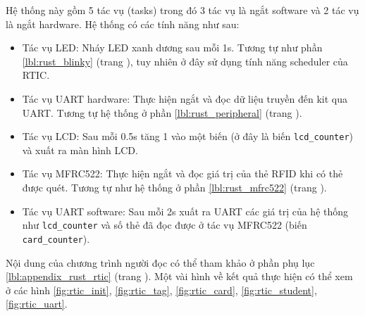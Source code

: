 Hệ thống này gồm 5 tác vụ (tasks) trong đó 3 tác vụ là ngắt software và 2 tác vụ là ngắt hardware.
Hệ thống có các tính năng như sau:
\begin{itemize}
    \item Tác vụ LED: Nháy LED xanh dương sau mỗi 1s. Tương tự như phần \ref{lbl:rust_blinky} (trang \pageref{lbl:rust_blinky}), tuy nhiên ở đây sử dụng tính năng scheduler của RTIC.
    \item Tác vụ UART hardware: Thực hiện ngắt và đọc dữ liệu truyền đến kit qua UART. Tương tự hệ thống ở phần \ref{lbl:rust_peripheral} (trang \pageref{lbl:rust_peripheral}).
    \item Tác vụ LCD: Sau mỗi 0.5s tăng 1 vào một biến (ở đây là biến \texttt{lcd_counter}) và xuất ra màn hình LCD.
    \item Tác vụ MFRC522: Thực hiện ngắt và đọc giá trị của thẻ RFID khi có thẻ được quét. Tương tự như hệ thống ở phần \ref{lbl:rust_mfrc522} (trang \pageref{lbl:rust_mfrc522}).
    \item Tác vụ UART software: Sau mỗi 2s xuất ra UART các giá trị của hệ thống như \texttt{lcd_counter} và số thẻ đã đọc được ở tác vụ MFRC522 (biến \texttt{card_counter}).
\end{itemize}

Nội dung của chương trình người đọc có thể tham khảo ở phần phụ lục \ref{lbl:appendix_rust_rtic} (trang \pageref{lbl:appendix_rust_rtic}).
Một vài hình về kết quả thực hiện có thể xem ở các hình \ref{fig:rtic_init}, \ref{fig:rtic_tag}, \ref{fig:rtic_card}, \ref{fig:rtic_student}, \ref{fig:rtic_uart}.

